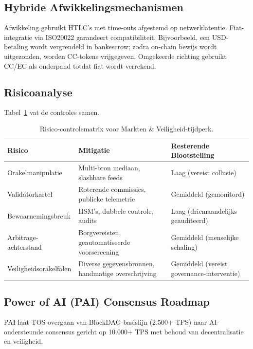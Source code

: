 \documentclass[11pt]{article}
\begin{document}
\subsection{Hybride Afwikkelingsmechanismen}
Afwikkeling gebruikt HTLC's met time-outs afgestemd op netwerklatentie. Fiat-integratie via ISO20022 garandeert compatibiliteit. Bijvoorbeeld, een USD-betaling wordt vergrendeld in bankescrow; zodra on-chain bewijs wordt uitgezonden, worden CC-tokens vrijgegeven. Omgekeerde richting gebruikt CC/EC als onderpand totdat fiat wordt verrekend.

\subsection{Risicoanalyse}
Tabel~\ref{tab:risk-markets} vat de controles samen.

\begin{table}[H]
  \centering
  \begin{tabular}{p{}p{}p{}}
    \toprule
    \textbf{Risico} & \textbf{Mitigatie} & \textbf{Resterende Blootstelling} \\
    \midrule
    Orakelmanipulatie & Multi-bron mediaan, slashbare feeds & Laag (vereist collusie) \\
    Validatorkartel & Roterende commissies, publieke telemetrie & Gemiddeld (gemonitord) \\
    Bewaarnemingsbreuk & HSM's, dubbele controle, audits & Laag (driemaandelijks geauditeerd) \\
    Arbitrage-achterstand & Borgvereisten, geautomatiseerde voorscreening & Gemiddeld (menselijke schaling) \\
    Veiligheidsorakelfalen & Diverse gegevensbronnen, handmatige overschrijving & Gemiddeld (vereist governance-interventie) \\
    \bottomrule
  \end{tabular}
  \caption{Risico-controlematrix voor Markten \& Veiligheid-tijdperk.}
  \label{tab:risk-markets}
\end{table}

\subsection{Power of AI (PAI) Consensus Roadmap}
\label{sec:pai-roadmap}
PAI laat TOS overgaan van BlockDAG-basislijn (2.500+ TPS) naar AI-ondersteunde consensus gericht op 10.000+ TPS met behoud van decentralisatie en veiligheid.
\end{document}
